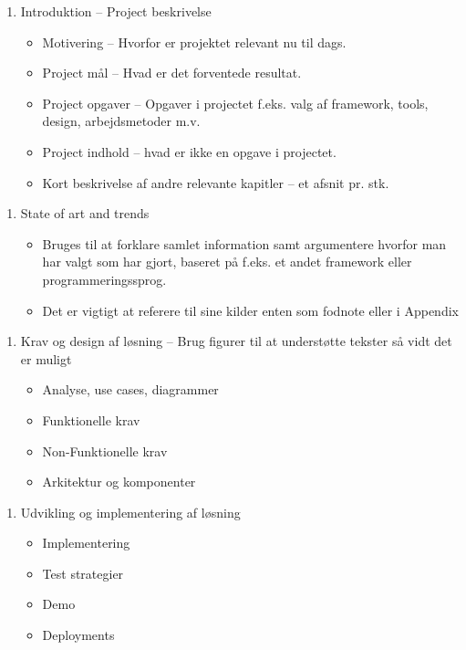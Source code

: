 \documentclass{report}
\begin{document}
    \begin{enumerate}
        \item Introduktion – Project beskrivelse
        \begin{itemize}
            \item Motivering – Hvorfor er projektet relevant nu til dags.
            \item Project mål – Hvad er det forventede resultat.
            \item Project opgaver – Opgaver i projectet f.eks. valg af framework, tools, design, arbejdsmetoder m.v.
            \item Project indhold – hvad er ikke en opgave i projectet.
            \item Kort beskrivelse af andre relevante kapitler – et afsnit pr. stk.
        \end{itemize}
    \end{enumerate}
    \begin{enumerate}
        \item State of art and trends
        \begin{itemize}
            \item Bruges til at forklare samlet information samt argumentere hvorfor man har valgt som har gjort, baseret på f.eks. et andet framework eller programmeringssprog.
            \item Det er vigtigt at referere til sine kilder enten som fodnote eller i Appendix
        \end{itemize}
    \end{enumerate}
    \begin{enumerate}
        \item Krav og design af løsning – Brug figurer til at understøtte tekster så vidt det er muligt
        \begin{itemize}
            \item Analyse, use cases, diagrammer
            \item Funktionelle krav
            \item Non-Funktionelle krav
            \item Arkitektur og komponenter
        \end{itemize}
    \end{enumerate}
    \begin{enumerate}
        \item Udvikling og implementering af løsning
        \begin{itemize}
            \item Implementering
            \item Test strategier
            \item Demo
            \item Deployments
        \end{itemize}
    \end{enumerate}
\end{document}
